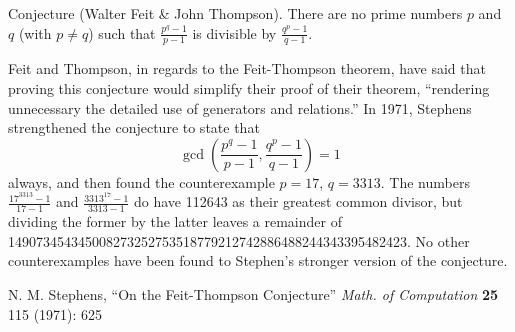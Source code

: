 \documentclass[12pt]{article}
\begin{document}
Conjecture (Walter Feit \& John Thompson). There are no prime numbers $p$ and $q$ (with $p \neq q$) such that $\displaystyle \frac{p^q - 1}{p - 1}$ is divisible by $\displaystyle \frac{q^p - 1}{q - 1}$.

Feit and Thompson, in regards to the Feit-Thompson theorem, have said that proving this conjecture would simplify their proof of their theorem, ``rendering unnecessary the detailed use of generators and relations.'' In 1971, Stephens strengthened the conjecture to state that $$\gcd\left(\frac{p^q - 1}{p - 1}, \frac{q^p - 1}{q - 1}\right) = 1$$ always, and then found the counterexample $p = 17$, $q = 3313$. The numbers $\displaystyle \frac{17^{3313} - 1}{17 - 1}$ and $\displaystyle \frac{3313^{17} - 1}{3313 - 1}$ do have 112643 as their greatest common divisor, but dividing the former by the latter leaves a remainder of 149073454345008273252753518779212742886488244343395482423. No other counterexamples have been found to Stephen's stronger version of the conjecture.

\begin{thebibliography}{1}
 N. M. Stephens, ``On the Feit-Thompson Conjecture'' {\it Math. of Computation} {\bf 25} 115 (1971): 625
\end{thebibliography}
\end{document}
